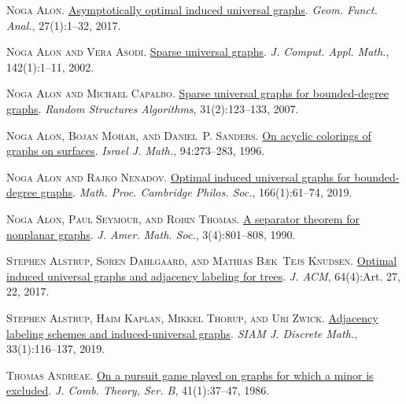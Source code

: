 \documentclass[a4paper,11pt]{article}
\theoremstyle{plain}
\theoremstyle{definition}
\begin{document}
\textsc{Noga Alon}.
\newblock \href{https://doi.org/10.1007/s00039-017-0396-9}{Asymptotically
  optimal induced universal graphs}.
\newblock \emph{Geom. Funct. Anal.}, 27(1):1--32, 2017.

\textsc{Noga Alon and Vera Asodi}.
\newblock \href{https://doi.org/10.1016/S0377-0427(01)00455-1}{Sparse universal
  graphs}.
\newblock \emph{J. Comput. Appl. Math.}, 142(1):1--11, 2002.

\textsc{Noga Alon and Michael Capalbo}.
\newblock \href{https://doi.org/10.1002/rsa.20143}{Sparse universal graphs for
  bounded-degree graphs}.
\newblock \emph{Random Structures Algorithms}, 31(2):123--133, 2007.

\textsc{Noga Alon, Bojan Mohar, and Daniel~P. Sanders}.
\newblock \href{https://doi.org/10.1007/BF02762708}{On acyclic colorings of
  graphs on surfaces}.
\newblock \emph{Israel J. Math.}, 94:273--283, 1996.

\textsc{Noga Alon and Rajko Nenadov}.
\newblock \href{https://doi.org/10.1017/S0305004117000706}{Optimal induced
  universal graphs for bounded-degree graphs}.
\newblock \emph{Math. Proc. Cambridge Philos. Soc.}, 166(1):61--74, 2019.

\textsc{Noga Alon, Paul Seymour, and Robin Thomas}.
\newblock \href{https://doi.org/10.2307/1990903}{A separator theorem for
  nonplanar graphs}.
\newblock \emph{J. Amer. Math. Soc.}, 3(4):801--808, 1990.

\textsc{Stephen Alstrup, S{\o}ren Dahlgaard, and Mathias B\ae k~Tejs Knudsen}.
\newblock \href{https://doi.org/10.1145/3088513}{Optimal induced universal
  graphs and adjacency labeling for trees}.
\newblock \emph{J. ACM}, 64(4):Art. 27, 22, 2017.

\textsc{Stephen Alstrup, Haim Kaplan, Mikkel Thorup, and Uri Zwick}.
\newblock \href{https://doi.org/10.1137/16M1105967}{Adjacency labeling schemes
  and induced-universal graphs}.
\newblock \emph{SIAM J. Discrete Math.}, 33(1):116--137, 2019.

\textsc{Thomas Andreae}.
\newblock \href{https://doi.org/10.1016/0095-8956(86)90026-2}{On a pursuit game
  played on graphs for which a minor is excluded}.
\newblock \emph{J. Comb. Theory, Ser. {B}}, 41(1):37--47, 1986.
\end{document}
